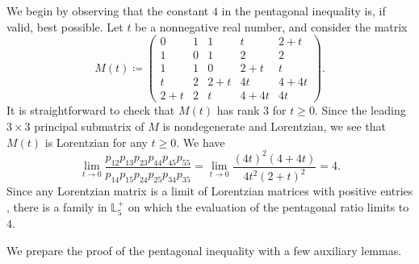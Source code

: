 \documentclass{amsart}
\theoremstyle{definition}
\theoremstyle{remark}
\def\L{\mathbb{L}}
\begin{document}
We begin by observing that the constant $4$ in the pentagonal inequality is, if valid, best possible.
Let $t$ be a nonnegative real number, and consider the matrix
\[
M(t)\coloneq
\begin{pmatrix}
0 & 1 & 1 & t & 2 + t \\[1pt]
1 & 0 & 1 & 2 & 2 \\[1pt]
1 & 1 & 0 & 2 + t & t \\[1pt]
t & 2 & 2 + t & 4t & 4 + 4t \\[1pt]
2 + t & 2 & t & 4 + 4t & 4t
\end{pmatrix}.
\]
It is straightforward to check that $M(t)$ has rank $3$ for $t \ge 0$.
Since the leading $3 \times 3$ principal submatrix of $M$ is nondegenerate and Lorentzian, we see that $M(t)$ is Lorentzian for any $t \ge 0$. We have
\[
\lim_{t \to 0} \frac{p_{12}p_{13}p_{23}p_{44}p_{45}p_{55}}{p_{14}p_{15}p_{24}p_{25}p_{34}p_{35}}=\lim_{t \to 0} \frac{(4t)^2(4+4t)}{4t^2(2+t)^2}=4. 
\]
Since any Lorentzian matrix is a limit of Lorentzian matrices with positive entries \cite[Section~2]{Branden-Huh},
there is a family in $\L_5^+$
on which the evaluation of the pentagonal ratio limits to $4$.

We prepare the proof of the pentagonal inequality with a few auxiliary lemmas.
\end{document}
